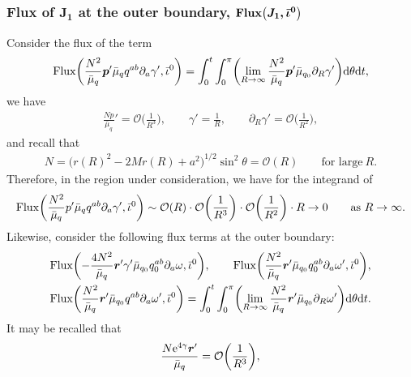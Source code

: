 \documentclass[11pt]{article}
\numberwithin{equation}{section}
\def\ptl{\partial}%
\def\mbo#1{\boldsymbol{#1}}%
\numberwithin{equation}{section}
\begin{document}
\subsubsection*{Flux of $\boldsymbol{J_1}$ at the outer boundary, $\boldsymbol{{\rm Flux} \bigl(J_1, \bar{\iota}^0\bigr)}$}
 Consider the flux of the term
\begin{align*}
{\rm Flux} \biggl(\frac{N^2}{ \bar{\mu}_q} \mbo{p}' \bar{\mu}_q q^{ab} \ptl_a \gamma', \bar{\iota}^0 \biggr) = \int^t_0 \int^\pi_0 \biggl(\lim_{R \to \infty} \frac{N^2}{ \bar{\mu}_q} \mbo{p}' \bar{\mu}_{q_0} \ptl_R \gamma' \biggr) {\rm d}\theta {\rm d}t,
\end{align*}
we have
\begin{align*}
\frac{N p}{\bar{\mu}_q}' = \mathcal{O} \biggl(\frac{1}{R^3} \biggr), \qquad \gamma' = \frac{1}{R}, \qquad \ptl_R \gamma' = \mathcal{O} \biggl(\frac{1}{R^2} \biggr),
\end{align*}
and recall that
\begin{align*}
N = \bigl(r(R)^2 - 2Mr(R) + a^2\bigr)^{1/2} \sin^2 \theta = \mathcal{O}(R) \qquad \text{for large} \ R.
\end{align*}
Therefore, in the region under consideration, we have for the integrand of
\[
{\rm Flux} \biggl(\frac{N^2}{ \bar{\mu}_q} p' \bar{\mu}_q q^{ab} \ptl_a \gamma', \bar{\iota}^0 \biggr) \sim \mathcal{O}(R) \cdot \mathcal{O} \biggl(\frac{1}{R^3}\biggr) \cdot \mathcal{O} \biggl(\frac{1}{R^2}\biggr) \cdot R \to 0 \qquad\text{as}\ R \to \infty.
\]
Likewise, consider the following flux terms at the outer boundary:
\begin{align*}
&{\rm Flux} \biggl(-\frac{4 N^2}{\bar{\mu}_q} \mbo{r}' \gamma' \bar{\mu}_{q_0} q_0^{ab} \ptl_a \omega, \bar{\iota}^0 \biggr), \qquad {\rm Flux} \biggl(\frac{N^2}{\bar{\mu}_q} \mbo{r}' \bar{\mu}_{q_0} q_0^{ab} \ptl_a \omega', \bar{\iota}^0 \biggr),
\\
&{\rm Flux} \biggl(\frac{N^2}{\bar{\mu}_q} \mbo{r}' \bar{\mu}_{q_0} q^{ab} \ptl_a \omega', \bar{\iota}^0 \biggr) = \int^t_0 \int^\pi_0 \biggl( \lim_{R \to \infty} \frac{N^2}{\bar{\mu}_q} \mbo{r}' \bar{\mu}_{q_0} \ptl_R \omega' \biggr) {\rm d} \theta {\rm d}t.
\end{align*}
It may be recalled that
\begin{align*}
\frac{N {\rm e}^{4 \gamma} \mbo{r}'}{\bar{\mu}_q} = \mathcal{O} \biggl(\frac{1}{R^3} \biggr),
\end{align*}
\end{document}
